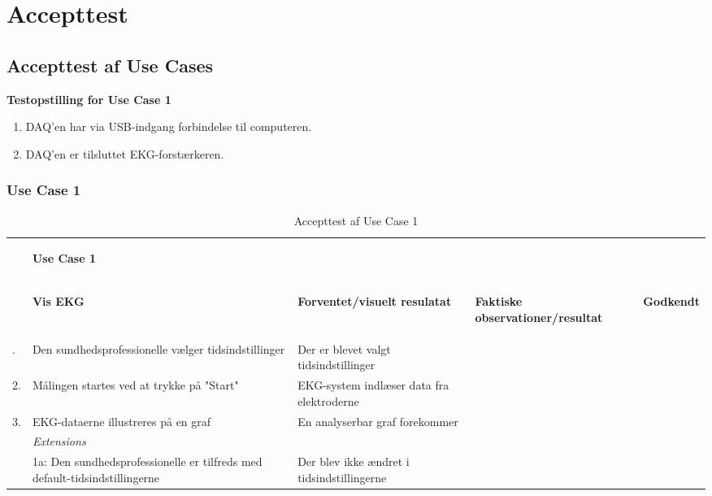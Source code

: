 \chapter{Accepttest}

\section{Accepttest af Use Cases}



\textbf{Testopstilling for Use Case 1}
\begin{enumerate}
	\item DAQ’en har via USB-indgang forbindelse til computeren.
	\item DAQ’en er tilsluttet EKG-forstærkeren.
\end{enumerate}

\subsection{Use Case 1}

\begin{table}[H]
	\begin{tabularx}{\textwidth}{l X X X c}
	\toprule
	~ & \begin{large}\textbf{Use Case 1}\end{large} & ~ & ~ & ~\\
	~ & \begin{large}\textbf{Vis EKG} \end{large}
	& \begin{large}\textbf{Forventet/visuelt resulatat}\end{large}
	& \begin{large}\textbf{Faktiske observationer/resultat}\end{large}
	& \begin{large}\textbf{Godkendt}\end{large}
	\\			\midrule \addlinespace[3mm]
					1.	& Den sundhedsprofessionelle vælger tidsindstillinger 
						& Der er blevet valgt tidsindstillinger 
						& ~
						& %
						\\ \midrule
					2. 	& Målingen startes ved at trykke på "Start"
						& EKG-system indlæser data fra elektroderne 
						& ~
						& %
						\\ \midrule
					3.	&  EKG-dataerne illustreres på en graf 
     					&  En analyserbar graf forekommer
     					& ~
     					& %
     					\\ \midrule
     				~	& \textit{Extensions}
     					&	~
     					&	~		\\ \midrule
     				~ 	&	1a: Den sundhedsprofessionelle er tilfreds med 					default-tidsindstillingerne
     					&  Der blev ikke ændret i tidsindstillingerne 
     					&  %
     					    \\ 

		
	
	\bottomrule	
	\end{tabularx}
	\caption{Accepttest af Use Case 1}
	\label{tab:AT_UC1}
\end{table}


